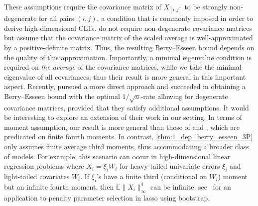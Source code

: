 \documentclass[aos]{imsart}
\begin{document}
These assumptions require the covariance matrix of $X_{[i,j]}$ to be strongly non-degenerate for all pairs $(i, j)$, a condition that is commonly imposed in order to derive high-dimensional CLTs.  do not require non-degenerate covariance matrices but assume that the covariance matrix of the scaled average is well-approximated by a positive-definite matrix. Thus, the resulting Berry--Esseen bound depends on the quality of this approximation.  
Importantly,  a minimal eigenvalue condition is required on {\it the average} of the covariance matrices, while we take the minimal eigenvalue of all covariances; thus their result is more general in this important aspect.
Recently, \citet{koike.degenerate} pursued a more direct approach and succeeded in obtaining a Berry--Esseen bound with the optimal $1/\sqrt{n}$-rate allowing for degenerate covariance matrices, provided that they satisfy additional assumptions. 
It would be interesting to explore an extension of their work in our setting.
In terms of moment assumption, our result is more general than those of    and \citet{koike.degenerate}, which are predicated on finite fourth moments. In contrast, \cref{thm:1_dep_berry_esseen_3P} only assumes finite average third moments, thus accommodating a broader class of models. 
For example, this scenario can occur in high-dimensional linear regression problems where $X_i = \xi_iW_i$ for heavy-tailed univariate errors $\xi_i$ and light-tailed covariates $W_i$. If $\xi_i$'s have a finite third (conditional on $W_i$) moment but an infinite fourth moment, then $\mathbb{E}\|X_i\|_{\infty}^4$ can be infinite; see~\citet[Section 4.1]{chernozhukov2023high} for an application to penalty parameter selection in lasso using bootstrap.
\end{document}
